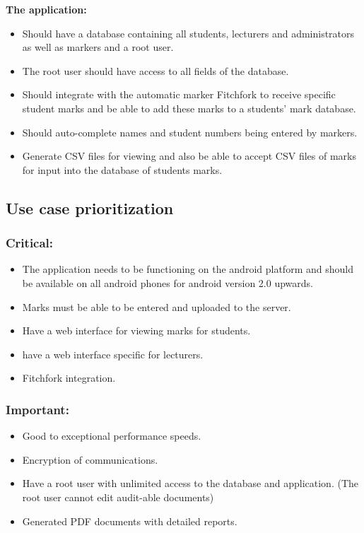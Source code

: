 \documentclass[11pt,a4paper]{article}
\begin{document}
\textbf{The application:}
\begin{itemize}
\item Should have a database containing all students, lecturers and administrators as well as markers and a root user.
\item The root user should have access to all fields of the database. 
\item Should integrate with the automatic marker Fitchfork to receive specific student marks and be able to add these marks to a students’ mark database.
\item Should auto-complete names and student numbers being entered by markers. 
\item Generate CSV files for viewing and also be able to accept CSV files of marks for input into the database of students marks.

\end{itemize}

\subsection{Use case prioritization}

\subsubsection{Critical: }
\begin{itemize}
\item The application needs to be functioning on the android platform and should be available on all android phones for android version 2.0 upwards.
\item Marks must be able to be entered and uploaded to the server.
\item Have a web interface for viewing marks for students.
\item have a web interface specific for lecturers.
\item Fitchfork integration.
\end{itemize}

\subsubsection{Important: } 
\begin{itemize}
\item Good to exceptional performance speeds.
\item Encryption of communications.
\item Have a root user with unlimited access to the database and application. (The root user cannot edit audit-able documents)
\item Generated PDF documents with detailed reports.
\end{itemize}
\end{document}
